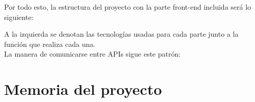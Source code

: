 \documentclass{article}
\begin{document}
\begin{figure}[H]
\end{figure}
\newpage
Por todo esto, la estructura del proyecto con la parte front-end incluida será lo siguiente:
\begin{figure}[H]
	\hspace*{-1.5cm}
\end{figure}
A la izquierda se denotan las tecnologías usadas para cada parte junto a la función que realiza cada una. \\
\newpage
La manera de comunicarse entre APIs sigue este patrón:
\begin{figure}[H]
	\hspace*{-2.5cm}
\end{figure}
\section{Memoria del proyecto}
\end{document}
